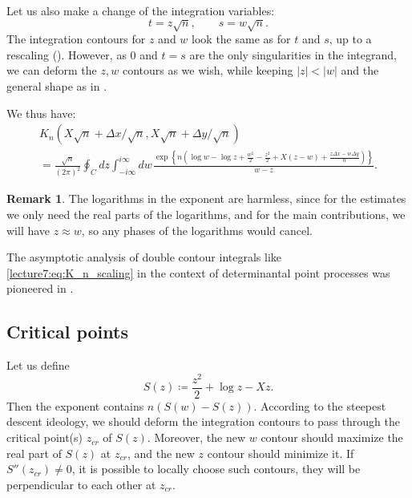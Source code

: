 \documentclass[letterpaper,11pt,oneside,reqno]{book}
\numberwithin{equation}{chapter}  %
\newcommand{\ssp}{\hspace{1pt}}
\theoremstyle{definition}
\newtheorem{remark}[proposition]{Remark}
\begin{document}
Let us also make a change of the integration variables:
\begin{equation*}
	t=z\sqrt n,\qquad s=w\sqrt n.
\end{equation*}
The integration contours for $z$ and $w$ look the same as for $t$ and $s$, up to a rescaling
(). However, as $0$
and $t=s$
are the only singularities in the integrand, we can deform the $z,w$
contours as we wish, while keeping $|z|<|w|$
and the general shape as in .

We thus have:
\begin{multline}
	\label{lecture7:eq:K_n_scaling}
	K_n(X\sqrt n+\Delta x/\sqrt n,X\sqrt n+\Delta y/\sqrt n)\\=
	\frac{\sqrt n}{(2\pi)^2}
	\oint_C dz\int_{-i\infty}^{i\infty}dw\ssp
	\frac{\exp
		\left\{
			n\left(
				\log w -\log z
				+\frac{w^2}{2}-\frac{z^2}{2}
				+X(z-w)+\frac{z \Delta x-w \Delta y}{n}
			\right)
		\right\}
	}{w-z}.
\end{multline}
\begin{remark}
	\label{lecture7:rmk:log-harmless}
	The logarithms in the exponent are harmless, since for the
	estimates we only need the real parts of the logarithms,
	and for the main contributions, we will have $z\approx w$, so
	any phases of the logarithms would cancel.
\end{remark}

The asymptotic analysis of double contour integrals like
\eqref{lecture7:eq:K_n_scaling} in the context of determinantal point processes
was pioneered in \cite[Section~3]{Okounkov2002}.

\subsection{Critical points}
\label{lecture7:sub:critical-points}

Let us define
\begin{equation*}
	S(z)\coloneqq
	\frac{z^2}{2}+\log z -X z.
\end{equation*}
Then the exponent contains $n \left( S(w)-S(z) \right)$.
According to the steepest descent ideology, we
should deform the integration contours
to pass through the critical point(s) $z_{cr}$ of $S(z)$.
Moreover, the new $w$ contour should maximize the real part of $S(z)$
at $z_{cr}$, and the new $z$ contour should minimize it.
If $S''(z_{cr})\ne 0$, it is possible to locally choose such contours,
they will be perpendicular to each other at $z_{cr}$.
\end{document}
